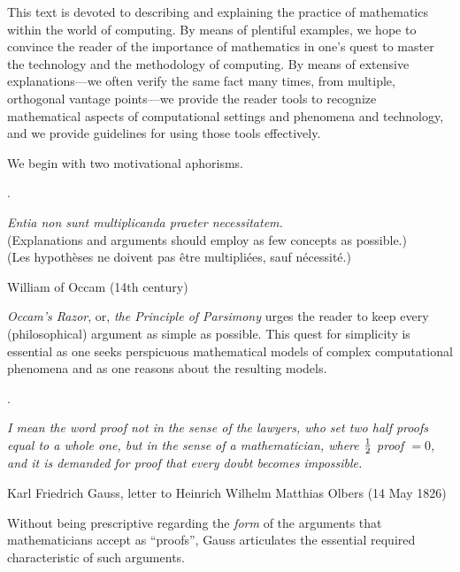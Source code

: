 \medskip

This text is devoted to describing and explaining the practice of mathematics within the world of computing.  By means of plentiful examples, we hope to convince the reader of the importance of mathematics in one's quest to master the technology and the methodology of computing.  By means of extensive explanations---we often verify the same fact many times, from multiple,
orthogonal vantage points---we provide the reader tools to recognize mathematical aspects of computational settings and phenomena and technology, and we provide guidelines for using those tools effectively.

\medskip

We begin with two motivational aphorisms.

\medskip

.


\noindent
{\it Entia non sunt multiplicanda praeter necessitatem.} \\
(Explanations and arguments should employ as few concepts as possible.) \\
(Les hypoth\`eses ne doivent pas \^etre multipli\' ees, sauf n\'ecessit\'e.)

\hfill {\small William of Occam (14th century)} 

\medskip

\noindent
{\it Occam's Razor}, or, {\it the Principle of Parsimony} urges the reader to keep every (philosophical) argument as simple as possible.  This quest for simplicity is essential as one seeks perspicuous mathematical models of complex computational phenomena and as one reasons about the resulting models.

\medskip

.

\noindent
{\it I mean the word proof not in the sense of the lawyers, who set two half proofs equal to a whole one, but in the sense of a mathematician, where ${1 \over 2}$ proof $= 0$, and it is demanded for proof that every doubt becomes impossible.}

\hfill {\small Karl Friedrich Gauss, letter to Heinrich Wilhelm Matthias Olbers (14 May 1826)}

\medskip

\noindent
Without being prescriptive regarding the {\em form} of the arguments that mathematicians accept as ``proofs'', Gauss articulates the essential required characteristic of such arguments.

